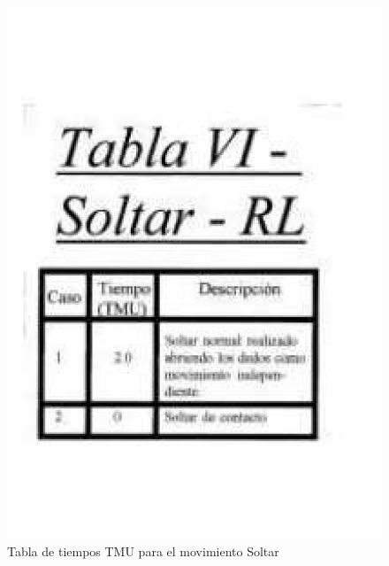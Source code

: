    \begin{figure}[H]
        \centering
        \includegraphics[trim = {20mm 40mm 20mm 25mm},clip,scale=0.25]{9/Img/tablaSoltar.pdf}
        \caption{ Tabla de tiempos TMU para el movimiento Soltar }
        \label{fig:bimanual}
    \end{figure}
    
    
    
